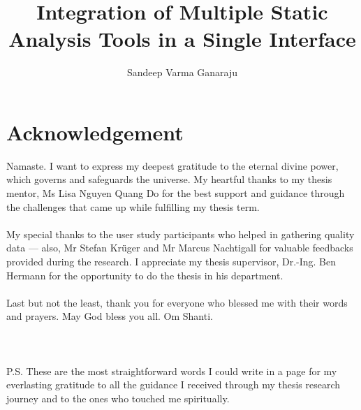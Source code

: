 \documentclass[]{upb_cs_thesis} %
\title{Integration of Multiple Static Analysis Tools in a Single Interface}
\author{Sandeep Varma Ganaraju}
\begin{document}
\let\cleardoublepage\clearpage
\clearpage

\chapter*{Acknowledgement}


\vspace*{\fill}
Namaste. I want to express my deepest gratitude to the eternal divine power, which governs and safeguards the universe. My heartful thanks to my thesis mentor, Ms Lisa Nguyen Quang Do for the best support and guidance through the challenges that came up while fulfilling my thesis term. \\ \\

My special thanks to the user study participants who helped in gathering quality data — also, Mr Stefan Krüger and Mr Marcus Nachtigall for valuable feedbacks provided during the research. I appreciate my thesis supervisor, Dr.-Ing. Ben Hermann for the opportunity to do the thesis in his department. \\ \\

Last but not the least, thank you for everyone who blessed me with their words and prayers. May God bless you all. Om Shanti. \\ \\ \\ \\

\noindent P.S. These are the most straightforward words I could write in a page for my everlasting gratitude to all the guidance I received through my thesis research journey and to the ones who touched me spiritually.
\vspace*{\fill}
%

\clearpage

\vspace*{\fill}
\begin{abstract}
	
\end{abstract}
\acresetall
\vspace*{\fill}
\let\cleardoublepage\clearpage

\tableofcontents %




\newpage
{}
\printbibliography 


\appendix



\listoffigures
\cleardoublepage


\end{document}
